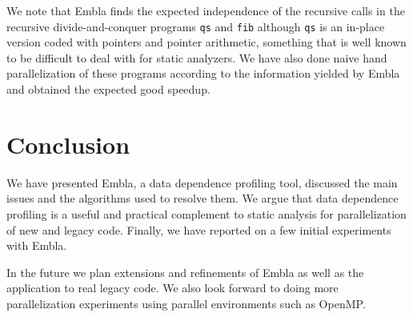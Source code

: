 \documentclass{acm_proc_article-sp}
\begin{document}
We note that Embla finds the expected independence of the recursive calls 
in the recursive divide-and-conquer programs {\tt qs} and
{\tt fib} although {\tt qs} is an in-place version coded 
with pointers and pointer arithmetic, something that is well known to be 
difficult to deal with for static analyzers. We have also done naive
hand parallelization of these programs according to the information 
yielded by Embla and obtained the expected good speedup.

\section{Conclusion}

We have presented Embla, a data dependence profiling tool, discussed the 
main issues and the algorithms used to resolve them. We argue that
data dependence profiling is a useful and practical complement to static
analysis for parallelization of new and legacy code. Finally, we have 
reported on a few initial experiments with Embla.

In the future we plan extensions and refinements of Embla as well as
the application to real legacy code. We also look forward to doing
more parallelization experiments using parallel environments such as
OpenMP.




\end{document}

